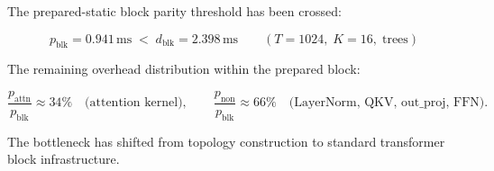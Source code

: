 \documentclass[11pt]{article}
\begin{document}
\bigskip

The prepared-static block parity threshold has been crossed:

\[
\boxed{
  p_{\text{blk}} = 0.941\,\text{ms}
  \;<\;
  d_{\text{blk}} = 2.398\,\text{ms}
  \qquad
  (T=1024,\; K=16,\; \text{trees})
}
\]

The remaining overhead distribution within the prepared block:

\[
\frac{p_{\text{attn}}}{p_{\text{blk}}} \approx 34\%
\quad\text{(attention kernel)},
\qquad
\frac{p_{\text{non}}}{p_{\text{blk}}} \approx 66\%
\quad\text{(LayerNorm, QKV, out\_proj, FFN)}.
\]

The bottleneck has shifted from topology construction to
standard transformer block infrastructure.
\end{document}
